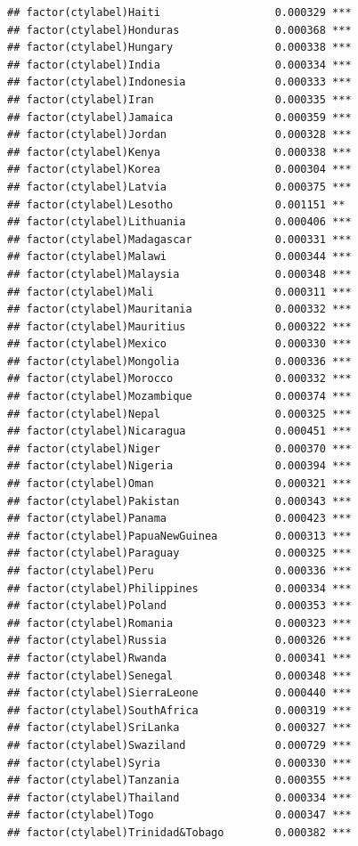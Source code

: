 \documentclass[12pt]{article}\usepackage[]{graphicx}\usepackage[]{color}
\makeatletter
\newenvironment{kframe}{%
 \def\at@end@of@kframe{}%
 \ifinner\ifhmode%
  \def\at@end@of@kframe{\end{minipage}}%
  \begin{minipage}{\columnwidth}%
 \fi\fi%
 \def\FrameCommand##1{\hskip\@totalleftmargin \hskip-\fboxsep
 \colorbox{shadecolor}{##1}\hskip-\fboxsep
     \hskip-\linewidth \hskip-\@totalleftmargin \hskip\columnwidth}%
 \MakeFramed {\advance\hsize-\width
   \@totalleftmargin\z@ \linewidth\hsize
   \@setminipage}}%
 {\par\unskip\endMakeFramed%
 \at@end@of@kframe}
\newenvironment{knitrout}{}{} %
\makeatother
\begin{document}
\begin{knitrout}
\begin{kframe}
\begin{verbatim}
## factor(ctylabel)Haiti                  0.000329 ***
## factor(ctylabel)Honduras               0.000368 ***
## factor(ctylabel)Hungary                0.000338 ***
## factor(ctylabel)India                  0.000334 ***
## factor(ctylabel)Indonesia              0.000333 ***
## factor(ctylabel)Iran                   0.000335 ***
## factor(ctylabel)Jamaica                0.000359 ***
## factor(ctylabel)Jordan                 0.000328 ***
## factor(ctylabel)Kenya                  0.000338 ***
## factor(ctylabel)Korea                  0.000304 ***
## factor(ctylabel)Latvia                 0.000375 ***
## factor(ctylabel)Lesotho                0.001151 ** 
## factor(ctylabel)Lithuania              0.000406 ***
## factor(ctylabel)Madagascar             0.000331 ***
## factor(ctylabel)Malawi                 0.000344 ***
## factor(ctylabel)Malaysia               0.000348 ***
## factor(ctylabel)Mali                   0.000311 ***
## factor(ctylabel)Mauritania             0.000332 ***
## factor(ctylabel)Mauritius              0.000322 ***
## factor(ctylabel)Mexico                 0.000330 ***
## factor(ctylabel)Mongolia               0.000336 ***
## factor(ctylabel)Morocco                0.000332 ***
## factor(ctylabel)Mozambique             0.000374 ***
## factor(ctylabel)Nepal                  0.000325 ***
## factor(ctylabel)Nicaragua              0.000451 ***
## factor(ctylabel)Niger                  0.000370 ***
## factor(ctylabel)Nigeria                0.000394 ***
## factor(ctylabel)Oman                   0.000321 ***
## factor(ctylabel)Pakistan               0.000343 ***
## factor(ctylabel)Panama                 0.000423 ***
## factor(ctylabel)PapuaNewGuinea         0.000313 ***
## factor(ctylabel)Paraguay               0.000325 ***
## factor(ctylabel)Peru                   0.000336 ***
## factor(ctylabel)Philippines            0.000334 ***
## factor(ctylabel)Poland                 0.000353 ***
## factor(ctylabel)Romania                0.000323 ***
## factor(ctylabel)Russia                 0.000326 ***
## factor(ctylabel)Rwanda                 0.000341 ***
## factor(ctylabel)Senegal                0.000348 ***
## factor(ctylabel)SierraLeone            0.000440 ***
## factor(ctylabel)SouthAfrica            0.000319 ***
## factor(ctylabel)SriLanka               0.000327 ***
## factor(ctylabel)Swaziland              0.000729 ***
## factor(ctylabel)Syria                  0.000330 ***
## factor(ctylabel)Tanzania               0.000355 ***
## factor(ctylabel)Thailand               0.000334 ***
## factor(ctylabel)Togo                   0.000347 ***
## factor(ctylabel)Trinidad&Tobago        0.000382 ***

\end{verbatim}
\end{kframe}
\end{knitrout}
\end{document}
